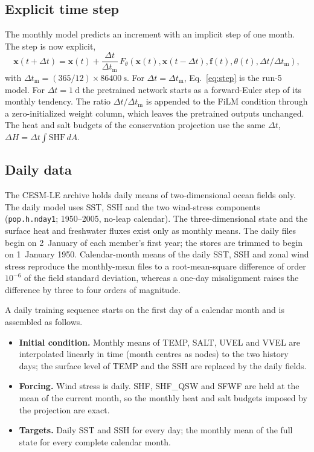 \documentclass[11pt]{article}
\begin{document}
\subsection{Explicit time step}

The monthly model predicts an increment with an implicit step of one month. The
step is now explicit,
\begin{equation}
  \mathbf{x}(t+\Delta t) = \mathbf{x}(t)
    + \frac{\Delta t}{\Delta t_{\mathrm{m}}}\, F_\theta\!\left(\mathbf{x}(t),
      \mathbf{x}(t-\Delta t), \mathbf{f}(t), \theta(t), \Delta t/\Delta t_{\mathrm{m}}\right),
  \label{eq:step}
\end{equation}
with $\Delta t_{\mathrm{m}} = (365/12)\times\SI{86400}{\second}$. For
$\Delta t = \Delta t_{\mathrm{m}}$, Eq.~\eqref{eq:step} is the run-5 model. For
$\Delta t = \SI{1}{\day}$ the pretrained network starts as a forward-Euler step
of its monthly tendency. The ratio $\Delta t/\Delta t_{\mathrm{m}}$ is appended
to the FiLM condition through a zero-initialized weight column, which leaves the
pretrained outputs unchanged. The heat and salt budgets of the conservation
projection use the same $\Delta t$,
$\Delta H = \Delta t \int \mathrm{SHF}\, dA$.

\subsection{Daily data}

The CESM-LE archive holds daily means of two-dimensional ocean fields only. The
daily model uses SST, SSH and the two wind-stress components
(\texttt{pop.h.nday1}; 1950--2005, no-leap calendar). The three-dimensional
state and the surface heat and freshwater fluxes exist only as monthly means.
The daily files begin on 2~January of each member's first year; the stores are
trimmed to begin on 1~January 1950. Calendar-month means of the daily SST, SSH
and zonal wind stress reproduce the monthly-mean files to a root-mean-square
difference of order $10^{-6}$ of the field standard deviation, whereas a
one-day misalignment raises the difference by three to four orders of magnitude.

A daily training sequence starts on the first day of a calendar month and is
assembled as follows.
\begin{itemize}[itemsep=2pt]
  \item \textbf{Initial condition.} Monthly means of TEMP, SALT, UVEL and VVEL
    are interpolated linearly in time (month centres as nodes) to the two
    history days; the surface level of TEMP and the SSH are replaced by the
    daily fields.
  \item \textbf{Forcing.} Wind stress is daily. SHF, SHF\_QSW and SFWF are held
    at the mean of the current month, so the monthly heat and salt budgets
    imposed by the projection are exact.
  \item \textbf{Targets.} Daily SST and SSH for every day; the monthly mean of
    the full state for every complete calendar month.
\end{itemize}
\end{document}
